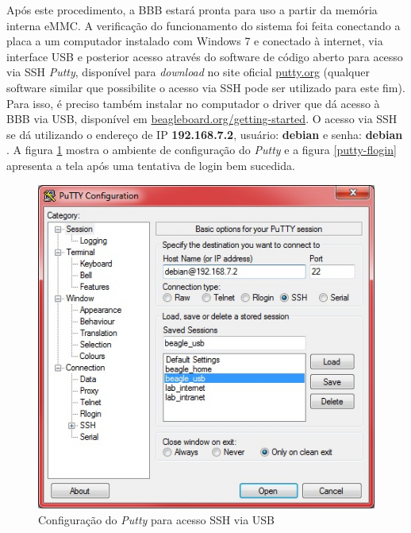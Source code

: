 
Após este procedimento, a BBB estará pronta para uso a partir da memória interna eMMC. A verificação do funcionamento do sistema foi feita conectando a placa a um computador instalado com Windows 7 e conectado à internet, via interface USB e posterior acesso através do software de código aberto para acesso via SSH \textit{Putty}, disponível para \textit{download} no site oficial \url{putty.org} \cite{putty} (qualquer software similar que possibilite o acesso via SSH pode ser utilizado para este fim). Para isso, é preciso também instalar no computador o driver que dá acesso à BBB via USB, disponível em \url{beagleboard.org/getting-started}. O acesso via SSH se dá utilizando o endereço de IP \textbf{192.168.7.2}, usuário: \textbf{debian} e senha: \textbf{debian} \cite{lumme}. A figura \ref{putty-cfg} mostra o ambiente de configuração do \textit{Putty} e a figura \ref{putty-flogin} apresenta a tela após uma tentativa de login bem sucedida.

\begin{figure}[H]
	\centering
	\includegraphics[scale=0.90]{./Resources/putty-cfg.jpg}
	\captionsetup{justification=centering}
	\caption[Configuração do \textit{Putty} para acesso SSH via USB]{Configuração do \textit{Putty} para acesso SSH via USB}
	\label{putty-cfg}
\end{figure}

